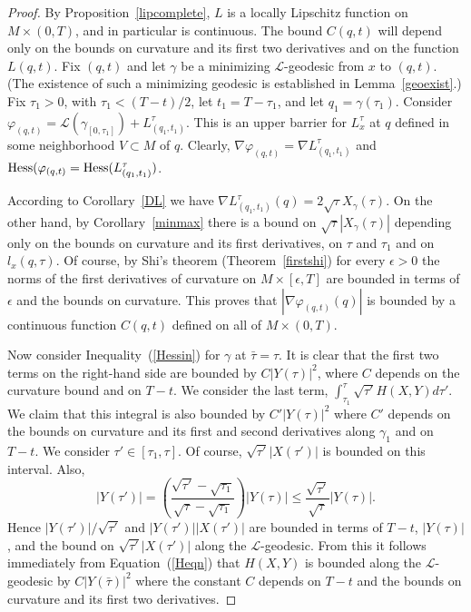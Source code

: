 \begin{proof}\sketch
{}
By Proposition~\ref{lipcomplete}, $L$ is a locally Lipschitz
function on $M\times (0,T)$, and in particular is continuous. The
bound $C(q,t)$ will depend only on the bounds on curvature and its
first two derivatives and on the function $L(q,t)$. Fix $(q,t)$ and
let $\gamma$ be a minimizing ${\mathcal L}$-geodesic from $x$ to
$(q,t)$. (The existence of such a minimizing geodesic is established
in Lemma~\ref{geoexist}.) Fix $\tau_1>0$, with $\tau_1<(T-t)/2$, let
$t_1=T-\tau_1$, and let $q_1=\gamma(\tau_1)$. Consider
$\varphi_{(q,t)}={\mathcal L}(\gamma_{[0,\tau_1]})+
L^\tau_{(q_1,t_1)}$. This is an upper barrier  for $L_x^\tau$ at $q$
defined in some neighborhood $V\subset M$ of $q$.  Clearly, $\nabla
\varphi_{(q,t)}=\nabla L^\tau_{(q_1,t_1)}$ and $\operatorname{Hess}(\varphi_{(q,t)}=\operatorname{Hess}( L^\tau_{(q_1,t_1)})$.



According to Corollary~\ref{DL} we have $\nabla
L^\tau_{(q_1,t_1)}(q)=2\sqrt{\tau}X_{\gamma}(\tau)$. On the other
hand, by Corollary~\ref{minmax} there is a bound on
$\sqrt{\tau}|X_{\gamma}(\tau)|$ depending only on the bounds on
curvature and its first derivatives, on $\tau$ and $\tau_1$ and on
$l_x(q,\tau)$. Of course, by Shi's theorem (Theorem~\ref{firstshi})
for every $\epsilon>0$ the norms of the first derivatives of
curvature on $M\times [\epsilon,T]$ are bounded in terms of
$\epsilon$ and the bounds on curvature.
 This
proves that $|\nabla \varphi_{(q,t)}(q)|$ is bounded by a continuous
function $C(q,t)$ defined on all of $M\times (0,T)$.

 Now consider Inequality~(\ref{Hessin}) for $\gamma$ at $\bar\tau=\tau$.
 It is clear that the first
 two terms on the right-hand side are bounded by $C|Y(\tau)|^2$,
 where $C$ depends on the curvature bound and on $T-t$. We consider
 the last term, $\int_{\tau_1}^{\tau}\sqrt{\tau'}H(X,Y)d\tau'$.
 We claim that this integral is also bounded by $C'|Y(\tau)|^2$
 where $C'$ depends on the bounds on curvature and its first and
 second derivatives along $\gamma_1$ and on $T-t$.
We consider $\tau'\in [\tau_1,\tau]$. Of course,
 $\sqrt{\tau'}|X(\tau')|$ is bounded on this interval. Also,
 $$|Y(\tau')|=\left(\frac{\sqrt{\tau'}-\sqrt{\tau_1}}{\sqrt{\tau}
 -\sqrt{\tau_1}}\right)|Y(\tau)|\le \frac{\sqrt{\tau'}}{\sqrt{\tau}}|Y(\tau)|.$$
Hence $|Y(\tau')|/\sqrt{\tau'}$ and $|Y(\tau')||X(\tau')|$ are
bounded in terms of $T-t$, $|Y(\tau)|$, and the bound on
$\sqrt{\tau'}|X(\tau')|$ along the ${\mathcal L}$-geodesic. From
this it follows immediately from Equation~(\ref{Heqn}) that $H(X,Y)$
is bounded along the ${\mathcal L}$-geodesic  by $C|Y(\bar\tau)|^2$
 where the constant $C$ depends on $T-t$ and the
 bounds on curvature and its first two derivatives.
\end{proof}

